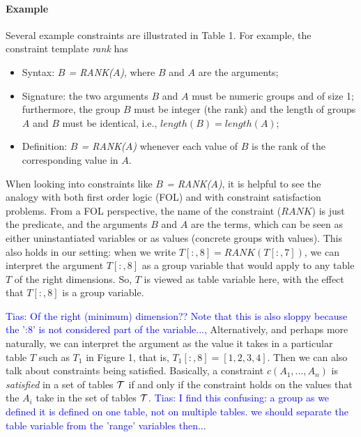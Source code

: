 \documentclass{sig-alternate-05-2015}
\newcommand{\tias}[1]{\textcolor{blue}{{\sc Tias:} #1}\xspace}
\newcommand{\CName}{Syntax\xspace}
\newcommand{\CSignature}{Signature\xspace}
\newcommand{\CFunction}{Definition\xspace}
\newcommand{\groups}{\ensuremath{\mathcal{G}}\xspace}
\newcommand{\range}[3]{\ensuremath{#1[#2,#3]}}
\newcommand{\rangeall}{:}
\newcommand{\eccalc}[2]{\ensuremath{#1 = #2}}
\newcommand{\ecrank}[2]{\eccalc{#1}{\mathit{RANK}(#2)}}
\begin{document}
\paragraph{Example}
Several example constraints are illustrated in Table 1.  For example, the constraint template \textit{rank} has
\begin{itemize}
\item \CName: \textit{$B$ = RANK($A$)}, where $B$ and $A$ are the arguments;
\item \CSignature: the two arguments $B$ and $A$ must be numeric groups and of size 1; furthermore, the group $B$ must be integer (the rank) and the length of groups $A$ and $B$ must be identical, i.e., $length(B) = length(A)$;
\item \CFunction: \textit{$B$ = RANK($A$)} whenever each value of $B$ is the rank of the corresponding value in $A$.
\end{itemize}

When looking into constraints like \textit{$B$ = RANK($A$)}, it is helpful to see the analogy with both first order logic (FOL) and with constraint satisfaction problems.
From a FOL perspective, the name of the constraint ($RANK$) is just the predicate, and the arguments $B$ and $A$ are the terms, which can be seen as either uninstantiated variables or as values (concrete groups with values).
This also holds in our setting: when we write
      $\ecrank{\range{T}{\rangeall}{8}}{\range{T}{\rangeall}{7}}$,
we can interpret the argument ${\range{T}{\rangeall}{8}}$ as a group variable that would apply to any table $T$ of the right dimensions.
So, $T$ is viewed as table variable here, with the effect that  ${\range{T}{\rangeall}{8}}$ is a group variable.

\tias{Of the right (minimum) dimension?? Note that this is also sloppy because the ':8' is not considered part of the variable...},
Alternatively, and perhaps more naturally, we can interpret the argument as the value it takes in a particular table $T$ such as $T_1$ in Figure 1, that is,
${\range{T_1}{\rangeall}{8}} =  [1,2,3,4]$.
Then we can also talk about constraints being satisfied. Basically, a constraint $c(A_1, ..., A_n)$ is {\em satisfied}  in a set of tables ${\cal T}$ if and only
if the constraint holds on the values that the $A_i$ take in the set of tables ${\cal T}$. \tias{I find this confusing: a group as we defined it is defined on one table, not on multiple tables. we should separate the table variable from the 'range' variables then...}
\end{document}
